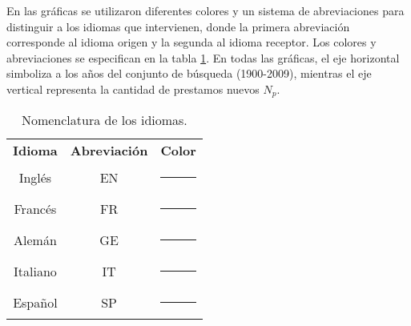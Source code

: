 

En las gráficas se utilizaron diferentes colores y un sistema de abreviaciones
para distinguir a los idiomas que intervienen, donde la primera abreviación
corresponde al idioma origen y la segunda al idioma receptor. Los colores y
abreviaciones se especifican  en la tabla \ref{tab.idcolor}.  En todas las
gráficas, el eje horizontal simboliza a los años del conjunto de búsqueda
(1900-2009),  mientras el eje vertical representa la cantidad de prestamos
nuevos $N_{p}$. 

\begin{table} %
	\centering
	\begin{tabular}{ccc}
		\textbf{Idioma} & \textbf{Abreviación} & \textbf{Color} \\
		Inglés          & EN                   & \textcolor{C1-EN}{\rule{0.25cm}{0.25cm}}           \\
		Francés         & FR                   & \textcolor{C1-FR}{\rule{0.25cm}{0.25cm}}      \\
		Alemán          & GE                   & \textcolor{C1-GE}{\rule{0.25cm}{0.25cm}}       \\
		Italiano        & IT                   & \textcolor{C1-IT}{\rule{0.25cm}{0.25cm}}          \\
		Español         & SP                   & \textcolor{C1-SP}{\rule{0.25cm}{0.25cm}}        
	\end{tabular}
	\caption{Nomenclatura de los idiomas.}
	\label{tab.idcolor}
\end{table} %

